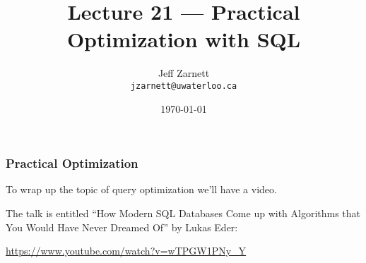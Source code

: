 

\title{Lecture 21 --- Practical Optimization with SQL }

\author{Jeff Zarnett \\ \small \texttt{jzarnett@uwaterloo.ca}}
\date{\today}




\begin{frame}
  \titlepage

 \end{frame}


\begin{frame}
\frametitle{Practical Optimization}

To wrap up the topic of query optimization we'll have a video. 

The talk is entitled ``How Modern SQL Databases Come up with Algorithms that You Would Have Never Dreamed Of'' by Lukas Eder: 

\begin{center}
\url{https://www.youtube.com/watch?v=wTPGW1PNy_Y}
\end{center}


\end{frame}






